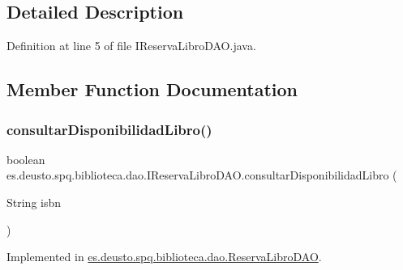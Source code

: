 \subsection{Detailed Description}


Definition at line 5 of file I\+Reserva\+Libro\+D\+A\+O.\+java.



\subsection{Member Function Documentation}
\mbox{\label{interfacees_1_1deusto_1_1spq_1_1biblioteca_1_1dao_1_1_i_reserva_libro_d_a_o_a56903b304697f889b59fb782a4e61aaf}} 
\subsubsection{\texorpdfstring{consultar\+Disponibilidad\+Libro()}{consultarDisponibilidadLibro()}}
{\footnotesize\ttfamily boolean es.\+deusto.\+spq.\+biblioteca.\+dao.\+I\+Reserva\+Libro\+D\+A\+O.\+consultar\+Disponibilidad\+Libro (\begin{DoxyParamCaption}\item[{String}]{isbn }\end{DoxyParamCaption})}



Implemented in \mbox{\hyperlink{classes_1_1deusto_1_1spq_1_1biblioteca_1_1dao_1_1_reserva_libro_d_a_o_adf3ff587646760b081c538ca54512c3b}{es.\+deusto.\+spq.\+biblioteca.\+dao.\+Reserva\+Libro\+D\+AO}}.

